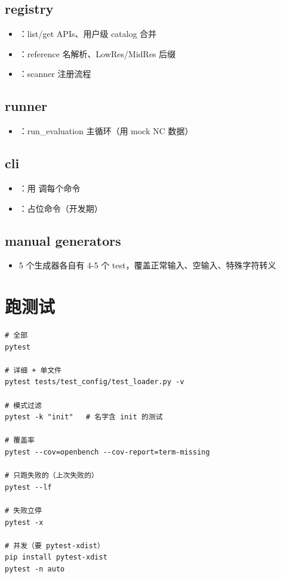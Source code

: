 \subsection{registry}

\begin{itemize}
  \item {}：list/get APIs、用户级 catalog 合并
  \item {}：reference 名解析、LowRes/MidRes 后缀
  \item {}：scanner 注册流程
\end{itemize}

\subsection{runner}

\begin{itemize}
  \item {}：run\_evaluation 主循环（用 mock NC 数据）
\end{itemize}

\subsection{cli}

\begin{itemize}
  \item {}：用  调每个命令
  \item {}：占位命令（开发期）
\end{itemize}

\subsection{manual generators}

\begin{itemize}
  \item 5 个生成器各自有 4-5 个 test，覆盖正常输入、空输入、特殊字符转义
\end{itemize}

\section{跑测试}

\begin{verbatim}
# 全部
pytest

# 详细 + 单文件
pytest tests/test_config/test_loader.py -v

# 模式过滤
pytest -k "init"   # 名字含 init 的测试

# 覆盖率
pytest --cov=openbench --cov-report=term-missing

# 只跑失败的（上次失败的）
pytest --lf

# 失败立停
pytest -x

# 并发（要 pytest-xdist）
pip install pytest-xdist
pytest -n auto
\end{verbatim}

